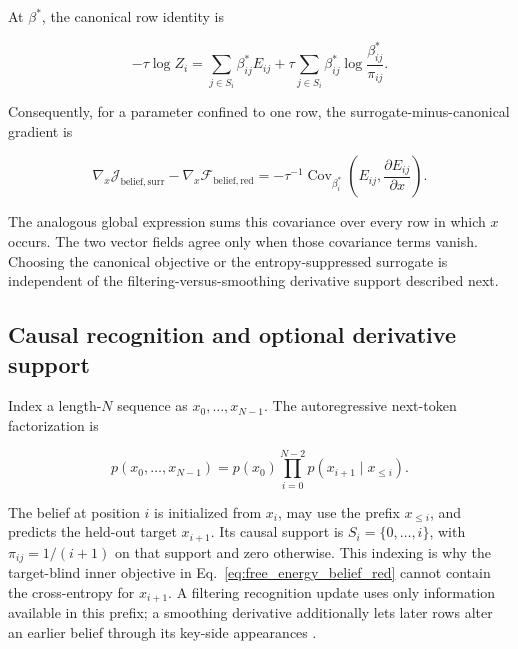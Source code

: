 \documentclass[twoside,11pt]{article}
\begin{document}
At $\beta^*$, the canonical row identity is

\begin{equation}
-\tau\log Z_i
=\sum_{j\in S_i}\beta_{ij}^*E_{ij}
+\tau\sum_{j\in S_i}\beta_{ij}^*\log\frac{\beta_{ij}^*}{\pi_{ij}}.
\label{eq:canonical_row_decomposition}
\end{equation}

Consequently, for a parameter confined to one row, the surrogate-minus-canonical gradient is

\begin{equation}
\nabla_x\mathcal{J}_{\mathrm{belief,surr}}
-\nabla_x\mathcal{F}_{\mathrm{belief,red}}
=-\tau^{-1}\operatorname{Cov}_{\beta_i^*}
\left(E_{ij},\frac{\partial E_{ij}}{\partial x}\right).
\label{eq:autograd_envelope_gap}
\end{equation}

The analogous global expression sums this covariance over every row in which $x$ occurs. The two vector fields agree only when those covariance terms vanish. Choosing the canonical objective or the entropy-suppressed surrogate is independent of the filtering-versus-smoothing derivative support described next.


\subsection{Causal recognition and optional derivative support}
\label{sec:filtering_free_energy}

Index a length-$N$ sequence as $x_0,\ldots,x_{N-1}$. The autoregressive next-token factorization is

\begin{equation}
p(x_0,\ldots,x_{N-1})
=p(x_0)\prod_{i=0}^{N-2}p(x_{i+1}\mid x_{\leq i}).
\label{eq:next_token_indexing}
\end{equation}

The belief at position $i$ is initialized from $x_i$, may use the prefix $x_{\leq i}$, and predicts the held-out target $x_{i+1}$. Its causal support is $S_i=\{0,\ldots,i\}$, with $\pi_{ij}=1/(i+1)$ on that support and zero otherwise. This indexing is why the target-blind inner objective in Eq.~\eqref{eq:free_energy_belief_red} cannot contain the cross-entropy for $x_{i+1}$. A filtering recognition update uses only information available in this prefix; a smoothing derivative additionally lets later rows alter an earlier belief through its key-side appearances \citep{chung2015recurrent,fraccaro2016sequential,krishnan2017structured}.
\end{document}
